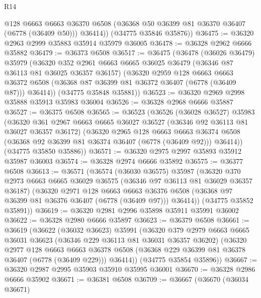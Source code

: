 \begin{lexlean}{R14}
\begin{coremodule}
          @128
          @6663
          @6663
          @36370
          @6508
          (@36368 @50 @36399 @81 @36370 @36407 (@6778 (@36409 @50)))
          @36414))
      (@34775 @35846 @35876))
@36475 := @36320 @2963 @2999 @35883 @35914 @35979 @36005
@36478 := @36328 @2962 @6666 @35882
@36479 := @36373 @6508
@36517 := @36475
    (@36478
      (@36026 @36479)
      @35979
      (@36320
        @352
        @2961
        @6663
        @6665
        @36025
        @36479
        (@36346 @87 @36113 @81 @36025 @36357 @36157)
        (@36320
          @2959
          @128
          @6663
          @6663
          @36372
          @6508
          (@36368 @87 @36399 @81 @36372 @36407 (@6778 (@36409 @87)))
          @36414))
      (@34775 @35848 @35881))
@36523 := @36320 @2969 @2998 @35888 @35913 @35983 @36004
@36526 := @36328 @2968 @6666 @35887
@36527 := @36375 @6508
@36565 := @36523
    (@36526
      (@36028 @36527)
      @35983
      (@36320
        @361
        @2967
        @6663
        @6665
        @36027
        @36527
        (@36346 @92 @36113 @81 @36027 @36357 @36172)
        (@36320
          @2965
          @128
          @6663
          @6663
          @36374
          @6508
          (@36368 @92 @36399 @81 @36374 @36407 (@6778 (@36409 @92)))
          @36414))
      (@34775 @35850 @35886))
@36571 := @36320 @2975 @2997 @35893 @35912 @35987 @36003
@36574 := @36328 @2974 @6666 @35892
@36575 := @36377 @6508
@36613 := @36571
    (@36574
      (@36030 @36575)
      @35987
      (@36320
        @370
        @2973
        @6663
        @6665
        @36029
        @36575
        (@36346 @97 @36113 @81 @36029 @36357 @36187)
        (@36320
          @2971
          @128
          @6663
          @6663
          @36376
          @6508
          (@36368 @97 @36399 @81 @36376 @36407 (@6778 (@36409 @97)))
          @36414))
      (@34775 @35852 @35891))
@36619 := @36320 @2981 @2996 @35898 @35911 @35991 @36002
@36622 := @36328 @2980 @6666 @35897
@36623 := @36379 @6508
@36661 := @36619
    (@36622
      (@36032 @36623)
      @35991
      (@36320
        @379
        @2979
        @6663
        @6665
        @36031
        @36623
        (@36346 @229 @36113 @81 @36031 @36357 @36202)
        (@36320
          @2977
          @128
          @6663
          @6663
          @36378
          @6508
          (@36368 @229 @36399 @81 @36378 @36407 (@6778 (@36409 @229)))
          @36414))
      (@34775 @35854 @35896))
@36667 := @36320 @2987 @2995 @35903 @35910 @35995 @36001
@36670 := @36328 @2986 @6666 @35902
@36671 := @36381 @6508
@36709 := @36667
    (@36670
      (@36034 @36671)

\end{coremodule}
\end{lexlean}

